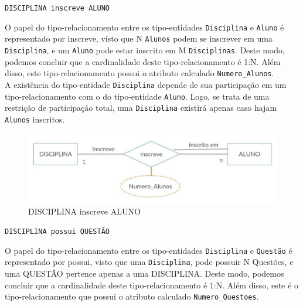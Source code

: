 \documentclass[12pt,a4paper]{article}
\begin{document}
\begin{center}
    \texttt{DISCIPLINA \texttt{inscreve} ALUNO}
\end{center}

O papel do tipo-relacionamento entre os tipo-entidades \texttt{Disciplina} e {\texttt{Aluno}} é representado por inscreve, visto que N \texttt{Alunos} podem se inscrever em uma \texttt{Disciplina}, e um \texttt{Aluno} pode estar inscrito em M \texttt{Disciplinas}. Deste modo, podemos concluir que a cardinalidade deste tipo-relacionamento é 1:N. Além disso, este tipo-relacionamento possui o atributo calculado {\texttt{Numero\_Alunos}}.\\

A existência do tipo-entidade \texttt{Disciplina} depende de sua participação em um tipo-relacionamento com o do tipo-entidade  {\texttt{Aluno}}. Logo, se trata de uma restrição de participação total, uma \texttt{Disciplina} existirá apenas caso hajam \texttt{Alunos} inscritos.\\

\begin{center}
\begin{figure}[h]
    \centering
    \includegraphics[width=\linewidth]{disciplinaAluno.jpg}
    \caption{DISCIPLINA inscreve ALUNO}
    \label{fig:disciplinaAluno}
\end{figure}
\end{center}

\pagebreak
\vspace{0.5cm}
\begin{center}
    \texttt{DISCIPLINA \texttt{possui} QUESTÃO}
\end{center}

O papel do tipo-relacionamento entre os tipo-entidades \texttt{Disciplina} e \texttt{Questão} é representado por possui, visto que uma \texttt{Disciplina}, pode possuir N Questões, e uma QUESTÃO pertence apenas a uma DISCIPLINA. Deste modo, podemos concluir que a cardinalidade deste tipo-relacionamento é 1:N. Além disso, este é o tipo-relacionamento que possui o atributo calculado \texttt{Numero\_Questoes}.\\
\end{document}
